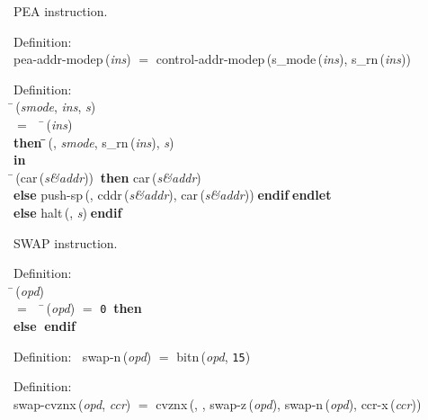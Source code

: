  PEA instruction.
\begin{tabbing}{\sc Definition}: \\  
{\rm{pea-addr-modep}}\,({\it{ins\/}}) $=$ {\rm{control-addr-modep}}\,({\rm{s\_mode}}\,({\it{ins\/}}), {\rm{s\_rn}}\,({\it{ins\/}}))
\end{tabbing}

\begin{tabbing}{\sc Definition}: \\  
\=\,({\it{smode\/}}, {\it{ins\/}}, {\it{s\/}}) \\ 
$=$$\;\;\;\;$\=\,({\it{ins\/}}) \\ 
{\bf then }\=\=\,({}, {\it{smode\/}}, {\rm{s\_rn}}\,({\it{ins\/}}), {\it{s\/}})\- \\ 
{\bf in} \\ 
\=\,({\rm{car}}\,({\it{s\&addr\/}}))$\;\;${\bf then }{\rm{car}}\,({\it{s\&addr\/}}) \\ 
{\bf else }{\rm{push-sp}}\,({}, {\rm{cddr}}\,({\it{s\&addr\/}}), {\rm{car}}\,({\it{s\&addr\/}}))$\;${\bf  endif}\-$\;${\bf  endlet}\- \\ 
{\bf else }{\rm{halt}}\,({}, {\it{s\/}})$\;${\bf  endif}\-\-
\end{tabbing}

 SWAP instruction.
\begin{tabbing}{\sc Definition}: \\  
\=\,({\it{opd\/}}) \\ 
$=$$\;\;\;\;$\=\,({\it{opd\/}}) $=$ {\tt{0}}$\;\;${\bf then }{} \\ 
{\bf else }{}$\;${\bf  endif}\-\-
\end{tabbing}

\begin{tabbing}{\sc Definition}:$\;\;$
{\rm{swap-n}}\,({\it{opd\/}}) $=$ {\rm{bitn}}\,({\it{opd\/}}, {\tt{15}})
\end{tabbing}

\begin{tabbing}{\sc Definition}: \\  
{\rm{swap-cvznx}}\,({\it{opd\/}}, {\it{ccr\/}}) $=$ {\rm{cvznx}}\,({}, {}, {\rm{swap-z}}\,({\it{opd\/}}), {\rm{swap-n}}\,({\it{opd\/}}), {\rm{ccr-x}}\,({\it{ccr\/}}))
\end{tabbing}


